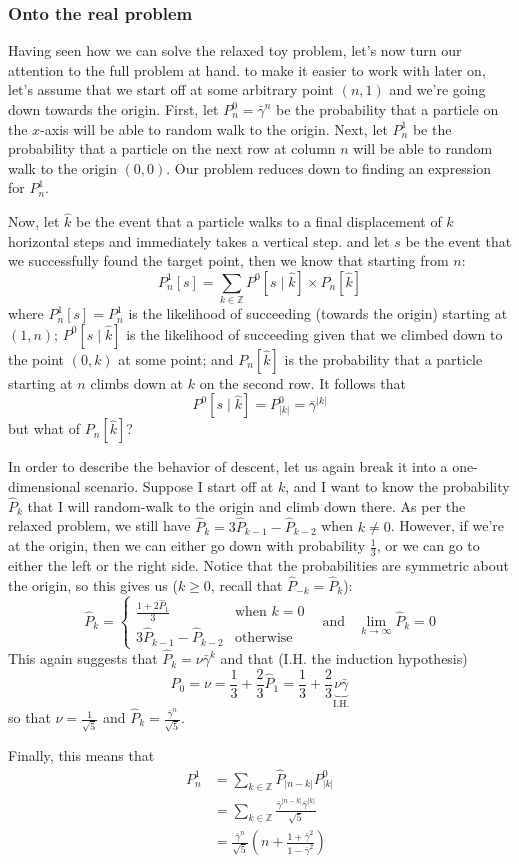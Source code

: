 \subsubsection{Onto the real problem}

Having seen how we can solve the relaxed toy problem, let's now turn our attention to the full problem at hand. to make it easier to work with later on, let's assume that we start off at some arbitrary point $(n,1)$ and we're going down towards the origin. First, let $P^{0}_n = \bar\gamma^n$ be the probability that a particle on the $x$-axis will be able to random walk to the origin. Next, let $P^{1}_n$ be the probability that a particle on the next row at column $n$ will be able to random walk to the origin $(0,0)$. Our problem reduces down to finding an expression for $P^1_n$.

Now, let $\hat k$ be the event that a particle walks to a final displacement of $k$ horizontal steps and immediately takes a vertical step. and let $s$ be the event that we successfully found the target point, then we know that starting from $n$:
$$
P^1_n[s] = \sum_{k \in \mathbb{Z}} P^0[s \mid \hat k] \times P_n[\hat k]
$$
where $P^1_n[s] = P^1_n$ is the likelihood of succeeding (towards the origin) starting at $(1,n)$; $P^0[s \mid \hat k]$ is the likelihood of succeeding given that we climbed down to the point $(0,k)$ at some point; and $P_n[\hat k]$ is the probability that a particle starting at $n$ climbs down at $k$ on the second row. It follows that
$$
P^0[s \mid \hat k] = P^0_{|k|} = \bar\gamma^{|k|}
$$
but what of $P_n[\hat k]$?

In order to describe the behavior of descent, let us again break it into a one-dimensional scenario. Suppose I start off at $k$, and I want to know the probability $\hat P_k$ that I will random-walk to the origin and climb down there. As per the relaxed problem, we still have $\hat P_k = 3 \hat P_{k-1} - \hat P_{k-2}$ when $k \ne 0$. However, if we're at the origin, then we can either go down with probability $\frac13$, or we can go to either the left or the right side. Notice that the probabilities are symmetric about the origin, so this gives us ($k \ge 0$, recall that $\hat P_{-k} = \hat P_k$):
$$
\hat P_k = \begin{cases}
\frac{1 + 2\hat P_1}{3} & \text{when }k = 0 \\
3 \hat P_{k-1} - \hat P_{k-2} & \text{otherwise}
\end{cases} ~~~~ \text{and} ~~~~ \lim_{k\to\infty} \hat P_k = 0
$$
This again suggests that $\hat P_k = \nu \bar\gamma^k$ and that (I.H. the induction hypothesis)
$$
P_0 = \nu = \frac13 + \frac23\hat P_1 = \frac13 + \frac23\underbrace{\nu \bar\gamma}_{\text{I.H.}}
$$
so that $\nu = \frac1{\sqrt{5}}$ and $\hat P_k = \frac{\bar\gamma^n}{\sqrt{5}}$.

Finally, this means that
\begin{align*}
P^1_n &= \sum_{k\in\mathbb{Z}} \hat P_{|n-k|} P^0_{|k|} \\
&=\sum_{k\in\mathbb{Z}} \frac{\bar\gamma^{|n-k|}\bar\gamma^{|k|}}{\sqrt{5}} \\
&= \boxed{\frac{\bar\gamma^n}{\sqrt{5}}\left(n + \frac{1 + \bar\gamma^2}{1 - \bar\gamma^2}\right)}
\end{align*}